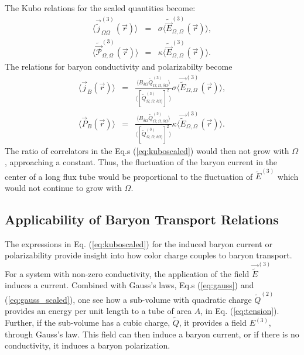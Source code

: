 \documentclass[aps, prc, 12pt, nofootinbib, showpacs, superscriptaddress, tightenlines, groupedaddress]{revtex4-2}
\begin{document}
The Kubo relations for the scaled quantities become:
\begin{eqnarray}
\langle \vec{\tilde{j}}^{(3)}_{\Omega\Omega}(\vec{r})\rangle&=&\sigma \langle\tilde{\vec{E}}^{(3)}_{\Omega,\Omega}(\vec{r})\rangle,\\
\nonumber
\langle\tilde{\vec{\mathcal{P}}}_{\Omega,\Omega}^{(3)}(\vec{r})\rangle&=&\kappa \langle\tilde{\vec{E}}^{(3)}_{\Omega,\Omega}(\vec{r})\rangle.
\end{eqnarray}
The relations for baryon conductivity and polarizabilty become
\begin{eqnarray}\label{eq:kuboscaled}
\langle\vec{j}_B(\vec{r})\rangle&=&\frac{\langle B_{\delta\Omega}\tilde{Q}^{(3)}_{\Omega,\Omega,\delta\Omega}\rangle}
{\langle[\tilde{Q}^{(3)}_{\Omega,\Omega,\delta\Omega\rangle}]^2\rangle}
\sigma\langle\vec{\tilde{E}}^{(3)}_{\Omega,\Omega}(\vec{r})\rangle,\\
\nonumber
\langle\vec{P}_B(\vec{r})\rangle&=&\frac{\langle B_{\delta\Omega}\tilde{Q}^{(3)}_{\Omega,\Omega,\delta\Omega}\rangle}
{\langle[\tilde{Q}^{(3)}_{\Omega,\Omega,\delta\Omega\rangle}]^2\rangle}
\kappa\langle\vec{\tilde{E}}^{(3)}_{\Omega,\Omega}(\vec{r})\rangle.
\end{eqnarray}
The ratio of correlators in the Eq.s (\ref{eq:kuboscaled}) would then not grow with $\Omega$, approaching a constant. Thus, the fluctuation of the baryon current in the center of a long flux tube would be proportional to the fluctuation of $\tilde{E}^{(3)}$ which would not continue to grow with $\Omega$. 

\subsection{Applicability of Baryon Transport Relations}

The expressions in Eq. (\ref{eq:kuboscaled}) for the induced baryon current or polarizability provide insight into how color charge couples to baryon transport. For a system with non-zero conductivity, the application of the field $\vec{\tilde{E}}^{{(3)}}$ induces a current. Combined with Gauss's laws, Eq.s (\ref{eq:gauss}) and (\ref{eq:gauss_scaled}), one see how a sub-volume with quadratic charge $\tilde{Q}^{(2)}$ provides an energy per unit length to a tube of area $A$, in Eq. (\ref{eq:tension}). Further, if the sub-volume has a cubic charge, $\tilde{Q}$, it provides a field $E^{(3)}$, through Gauss's law. This field can then induce a baryon current, or if there is no conductivity, it induces a baryon polarization. 
\end{document}
